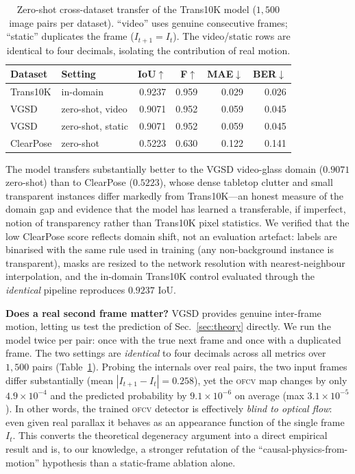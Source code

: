 \documentclass{article}
\newcommand{\ofcv}{\textsc{ofcv}}
\newcommand{\iou}{IoU}
\begin{document}
\begin{table}[t]
\centering
\caption{Zero-shot cross-dataset transfer of the Trans10K model
($1{,}500$ image pairs per dataset). ``video'' uses genuine consecutive
frames; ``static'' duplicates the frame ($I_{t+1}=I_t$). The video/static rows
are identical to four decimals, isolating the contribution of real motion.}
\label{tab:cross}
\setlength{\tabcolsep}{4.5pt}
\begin{tabular}{llrrrr}
\toprule
Dataset & Setting & \iou$\uparrow$ & F$\uparrow$ & MAE$\downarrow$ & BER$\downarrow$ \\
\midrule
Trans10K & in-domain         & 0.9237 & 0.959 & 0.029 & 0.026 \\
VGSD     & zero-shot, video  & 0.9071 & 0.952 & 0.059 & 0.045 \\
VGSD     & zero-shot, static & 0.9071 & 0.952 & 0.059 & 0.045 \\
ClearPose& zero-shot         & 0.5223 & 0.630 & 0.122 & 0.141 \\
\bottomrule
\end{tabular}
\end{table}

The model transfers substantially better to the VGSD video-glass domain
($0.9071$ zero-shot) than to ClearPose ($0.5223$), whose dense tabletop clutter
and small transparent instances differ markedly from Trans10K---an honest
measure of the domain gap and evidence that the model has learned a
transferable, if imperfect, notion of transparency rather than Trans10K pixel
statistics. We verified that the low ClearPose score reflects domain shift, not
an evaluation artefact: labels are binarised with the same rule used in training
(any non-background instance is transparent), masks are resized to the network
resolution with nearest-neighbour interpolation, and the in-domain Trans10K
control evaluated through the \emph{identical} pipeline reproduces $0.9237$
\iou{}.

\textbf{Does a real second frame matter?} VGSD provides genuine inter-frame
motion, letting us test the prediction of Sec.~\ref{sec:theory} directly. We run
the model twice per pair: once with the true next frame and once with a
duplicated frame. The two settings are \emph{identical} to four decimals across
all metrics over $1{,}500$ pairs (Table~\ref{tab:cross}). Probing the internals over real pairs, the
two input frames differ substantially (mean $|I_{t+1}-I_t|=0.258$), yet the
\ofcv{} map changes by only $4.9\times10^{-4}$ and the predicted probability by
$9.1\times10^{-6}$ on average (max $3.1\times10^{-5}$). In other words, the
trained \ofcv{} detector is effectively \emph{blind to optical flow}: even given
real parallax it behaves as an appearance function of the single frame
$I_t$. This converts the theoretical degeneracy argument into a direct empirical
result and is, to our knowledge, a stronger refutation of the
``causal-physics-from-motion'' hypothesis than a static-frame ablation alone.
\end{document}
